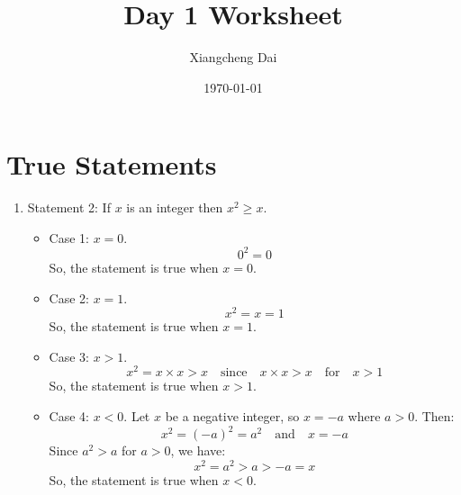 \documentclass{article}
\begin{document}
\title{Day 1 Worksheet}
\author{Xiangcheng Dai}
\date{\today}

\maketitle

\section{True Statements}

\begin{enumerate}
    \item Statement 2: If $x$ is an integer then $x^2 \geq x$.
          \begin{itemize}
              \item Case 1: $x = 0$.
                    \[
                        0^2 = 0
                    \]
                    So, the statement is true when $x = 0$.
              \item Case 2: $x = 1$.
                    \[
                        x^2 = x = 1
                    \]
                    So, the statement is true when $x = 1$.
              \item Case 3: $x > 1$.
                    \[
                        x^2 = x \times x > x \quad \text{since} \quad x \times x > x \quad \text{for} \quad x > 1
                    \]
                    So, the statement is true when $x > 1$.
              \item Case 4: $x < 0$.\newline
                    Let \(x\) be a negative integer, so \(x = -a\) where \(a > 0\). Then:
                    \[
                        x^2 = {(-a)}^2 = a^2 \quad \text{and} \quad x = -a
                    \]
                    Since \(a^2 > a\) for \(a > 0\), we have:
                    \[
                        x^2 = a^2 > a > -a = x
                    \]
                    So, the statement is true when $x < 0$.


\end{itemize}
\end{enumerate}
\end{document}
